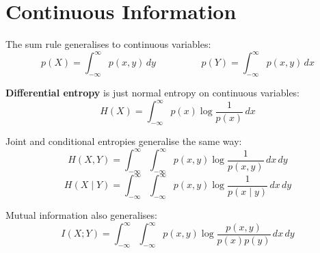 \documentclass[a4paper, 11pt]{article}
\begin{document}
\section*{Continuous Information}
{
    The sum rule generalises to continuous variables:
    \[p(X) = \int_{-\infty}^{\infty}{p(x,y) \, dy} \hspace{2cm} p(Y) = \int_{-\infty}^{\infty}{p(x,y) \, dx}\]

    \textbf{Differential entropy} is just normal entropy on continuous variables:
    \[H(X) = \int_{-\infty}^{\infty}{p(x) \log\frac{1}{p(x)} \, dx}\]

    Joint and conditional entropies generalise the same way:
    \[H(X,Y) = \int_{-\infty}^{\infty}\int_{-\infty}^{\infty}{p(x,y) \log\frac{1}{p(x,y)} \, dx\,dy}\]
    \[H(X \mid Y) = \int_{-\infty}^{\infty}\int_{-\infty}^{\infty}{p(x,y) \log\frac{1}{p(x \mid y)} \, dx\,dy}\]

    Mutual information also generalises:
    \[I(X;Y) = \int_{-\infty}^{\infty}\int_{-\infty}^{\infty}{p(x,y) \log\frac{p(x,y)}{p(x)p(y)} \, dx\,dy}\]
}
\end{document}
